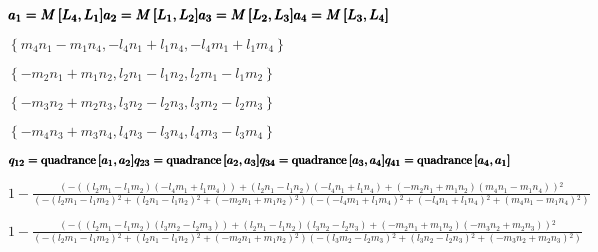 \documentclass{article}
\begin{document}
\begin{doublespace}
\noindent\(\pmb{a_1 = M\left[L_4,L_1\right]}\\
\pmb{a_2 = M\left[L_1,L_2\right]}\\
\pmb{a_3 = M\left[L_2,L_3\right]}\\
\pmb{a_4 = M\left[L_3,L_4\right]}\)
\end{doublespace}

\begin{doublespace}
\noindent\(\left\{m_4 n_1-m_1 n_4,-l_4 n_1+l_1 n_4,-l_4 m_1+l_1 m_4\right\}\)
\end{doublespace}

\begin{doublespace}
\noindent\(\left\{-m_2 n_1+m_1 n_2,l_2 n_1-l_1 n_2,l_2 m_1-l_1 m_2\right\}\)
\end{doublespace}

\begin{doublespace}
\noindent\(\left\{-m_3 n_2+m_2 n_3,l_3 n_2-l_2 n_3,l_3 m_2-l_2 m_3\right\}\)
\end{doublespace}

\begin{doublespace}
\noindent\(\left\{-m_4 n_3+m_3 n_4,l_4 n_3-l_3 n_4,l_4 m_3-l_3 m_4\right\}\)
\end{doublespace}

\begin{doublespace}
\noindent\(\pmb{q_{12}=\text{quadrance}\left[a_1,a_2\right]}\\
\pmb{q_{23}=\text{quadrance}\left[a_2,a_3\right]}\\
\pmb{q_{34}=\text{quadrance}\left[a_3,a_4\right]}\\
\pmb{q_{41}=\text{quadrance}\left[a_4,a_1\right]}\)
\end{doublespace}

\begin{doublespace}
\noindent\(1-\frac{\left(-\left(\left(l_2 m_1-l_1 m_2\right) \left(-l_4 m_1+l_1 m_4\right)\right)+\left(l_2 n_1-l_1 n_2\right) \left(-l_4 n_1+l_1
n_4\right)+\left(-m_2 n_1+m_1 n_2\right) \left(m_4 n_1-m_1 n_4\right)\right){}^2}{\left(-\left(l_2 m_1-l_1 m_2\right){}^2+\left(l_2 n_1-l_1 n_2\right){}^2+\left(-m_2
n_1+m_1 n_2\right){}^2\right) \left(-\left(-l_4 m_1+l_1 m_4\right){}^2+\left(-l_4 n_1+l_1 n_4\right){}^2+\left(m_4 n_1-m_1 n_4\right){}^2\right)}\)
\end{doublespace}

\begin{doublespace}
\noindent\(1-\frac{\left(-\left(\left(l_2 m_1-l_1 m_2\right) \left(l_3 m_2-l_2 m_3\right)\right)+\left(l_2 n_1-l_1 n_2\right) \left(l_3 n_2-l_2 n_3\right)+\left(-m_2
n_1+m_1 n_2\right) \left(-m_3 n_2+m_2 n_3\right)\right){}^2}{\left(-\left(l_2 m_1-l_1 m_2\right){}^2+\left(l_2 n_1-l_1 n_2\right){}^2+\left(-m_2
n_1+m_1 n_2\right){}^2\right) \left(-\left(l_3 m_2-l_2 m_3\right){}^2+\left(l_3 n_2-l_2 n_3\right){}^2+\left(-m_3 n_2+m_2 n_3\right){}^2\right)}\)
\end{doublespace}
\end{document}
